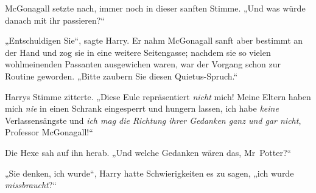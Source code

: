 McGonagall setzte nach, immer noch in dieser sanften Stimme. „Und was würde danach mit ihr passieren?“

„Entschuldigen Sie“, sagte Harry. Er nahm McGonagall sanft aber bestimmt an der Hand und zog sie in eine weitere Seitengasse; nachdem sie so vielen wohlmeinenden Passanten ausgewichen waren, war der Vorgang schon zur Routine geworden. „Bitte zaubern Sie diesen Quietus-Spruch.“


Harrys Stimme zitterte. „Diese Eule repräsentiert \emph{nicht} mich! Meine Eltern haben mich \emph{nie} in einen Schrank eingesperrt und hungern lassen, ich habe \emph{keine} Verlassensängste und \emph{ich mag die Richtung ihrer Gedanken ganz und gar nicht}, Professor McGonagall!“

Die Hexe sah auf ihn herab. „Und welche Gedanken wären das, Mr~Potter?“

„Sie denken, ich wurde“, Harry hatte Schwierigkeiten es zu sagen, „ich wurde \emph{missbraucht}?“

